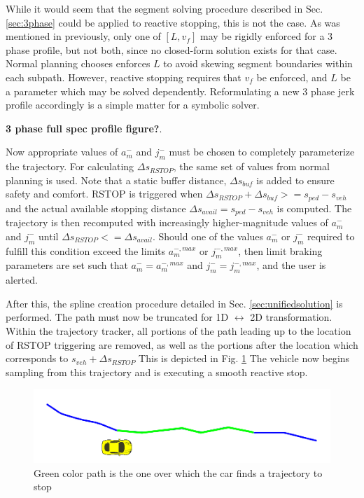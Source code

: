 \documentclass[letterpaper, 10 pt, conference]{ieeeconf}  %
\begin{document}
While it would seem that the segment solving procedure described in Sec. \ref{sec:3phase} could be applied to reactive stopping, this is not the case.
As was mentioned in previously, only one of $[L, v_f]$ may be rigidly enforced for a 3 phase profile, but not both, since no closed-form solution exists for that case.
Normal planning chooses enforces $L$ to avoid skewing segment boundaries within each subpath.
However, reactive stopping requires that $v_f$ be enforced, and $L$ be a parameter which may be solved dependently.
Reformulating a new 3 phase jerk profile accordingly is a simple matter for a symbolic solver.

\textbf{3 phase full spec profile figure?}. 

Now appropriate values of $a_m^-$ and $j_m^-$ must be chosen to completely parameterize the trajectory.
For calculating $\Delta s_{RSTOP}$, the same set of values from normal planning is used.
Note that a static buffer distance, $\Delta s_{buf}$ is added to ensure safety and comfort.
RSTOP is triggered when $\Delta s_{RSTOP} + \Delta s_{buf} >= s_{ped} - s_{veh}$ and the actual available stopping distance $\Delta s_{avail} = s_{ped} - s_{veh}$ is computed.
The trajectory is then recomputed with increasingly higher-magnitude values of $a_m^-$ and $j_m^-$ until $\Delta s_{RSTOP} <= \Delta s_{avail}$.
Should one of the values $a_m^-$ or $j_m^-$ required to fulfill this condition exceed the limits $a_m^{-,max}$ or $j_m^{-,max}$, then limit braking parameters are set such that $a_m^-=a_m^{-,max}$ and $j_m^-=j_m^{-,max}$, and the user is alerted.

After this, the spline creation procedure detailed in Sec. \ref{sec:unifiedsolution} is performed.
The path must now be truncated for 1D $\leftrightarrow$ 2D transformation.
Within the trajectory tracker, all portions of the path leading up to the location of RSTOP triggering are removed, as well as the portions after the location which corresponds to $s_{veh} + \Delta s_{RSTOP}$
This is depicted in Fig. \ref{fig:pathtostop}
The vehicle now begins sampling from this trajectory and is executing a smooth reactive stop.

\begin{figure}[thpb]
  \centering
  \includegraphics[width=1.0\columnwidth]{graphics/RSTOP_path_truncation.png}
  \caption{Green color path is the one over which the car finds a trajectory to stop}
  \label{fig:pathtostop}
\end{figure}
\end{document}
